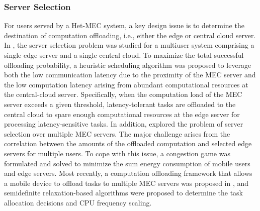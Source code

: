 \documentclass[journal]{IEEEtran}
\begin{document}
\subsubsection{\textbf{Server Selection}} For users served by a Het-MEC system, a  key design  issue is to determine the destination of computation offloading, i.e., either the edge or central cloud server. In \cite{zhao2015cooperative}, the server selection problem was studied for a multiuser system comprising a single edge server and a single  central cloud. To maximize the total successful offloading probability, a heuristic scheduling algorithm was proposed to leverage both the low communication latency due to  the proximity of the  MEC server and the low computation latency arising from  abundant computational resources at the central-cloud server. Specifically, when the computation load of the MEC server exceeds a given threshold, latency-tolerant tasks are offloaded to the central cloud to spare enough computational resources at the edge server for processing latency-sensitive tasks. In addition, \cite{ge2012game} explored the problem of server selection over multiple MEC servers. The major challenge arises from the correlation between the amounts of the offloaded computation and selected edge servers for multiple users. To cope with this issue, a congestion game was formulated and solved to minimize the sum energy consumption of mobile users and edge servers. Most recently, a computation offloading framework that allows a mobile device to offload tasks to multiple MEC servers was proposed in \cite{TQDinh1704}, and semidefinite relaxation-based algorithms were proposed to determine the task allocation decisions and CPU frequency scaling.
\end{document}
